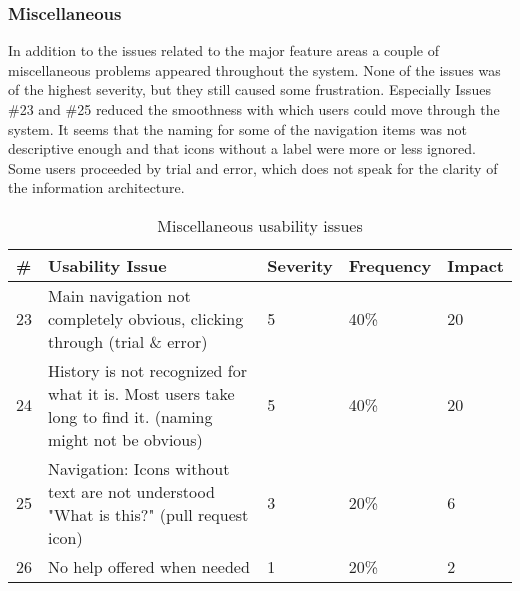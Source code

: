 \subsubsection{Miscellaneous}
In addition to the issues related to the major feature areas a couple of miscellaneous problems appeared throughout the system. None of the issues was of the highest severity, but they still caused some frustration. Especially Issues \#23 and \#25 reduced the smoothness with which users could move through the system. It seems that the naming for some of the navigation items was not descriptive enough and that icons without a label were more or less ignored. Some users proceeded by trial and error, which does not speak for the clarity of the information architecture.

\begin{table}[h!]
\centering
\begin{tabular}{|l|p{7cm}|l|l|l|}
\hline
\rowcolor[HTML]{EFEFEF}
\textbf{\#} & \textbf{Usability Issue} & \textbf{Severity} & \textbf{Frequency} & \textbf{Impact} \\ \hline
23 & Main navigation not completely obvious, clicking through (trial \& error) & 5 & 40\% & 20 \\ \hline
24 & History is not recognized for what it is. Most users take long to find it. (naming might not be obvious) & 5 & 40\% & 20 \\ \hline
25 & Navigation: Icons without text are not understood "What is this?" (pull request icon) & 3 & 20\% & 6 \\ \hline
26 & No help offered when needed & 1 & 20\% & 2 \\ \hline
\end{tabular}
\caption{Miscellaneous usability issues}
\label{table:issues-misc}
\end{table}




